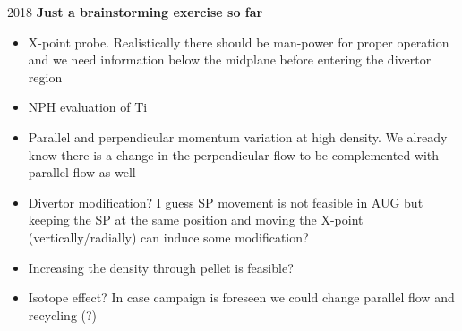 \documentclass[10pt, compress]{beamer}
\begin{document}
\begin{frame}{2018}
  \textbf{Just a brainstorming exercise so far}
  \begin{itemize}
    \item X-point probe. Realistically there should be man-power for
      proper operation and we need information below the midplane
      before entering the divertor region
    \item NPH evaluation of Ti
    \item Parallel and perpendicular momentum variation at high
      density. We already know there is a change in the perpendicular
      flow to be complemented with parallel flow as well
    \item Divertor modification? I guess SP movement is not feasible
      in AUG but keeping the SP at the same position and moving the
      X-point (vertically/radially) can induce some modification?
    \item Increasing the density through pellet is feasible?
    \item Isotope effect? In case campaign is foreseen we could change
      parallel flow and recycling (?)
  \end{itemize}
\end{frame}
\end{document}
